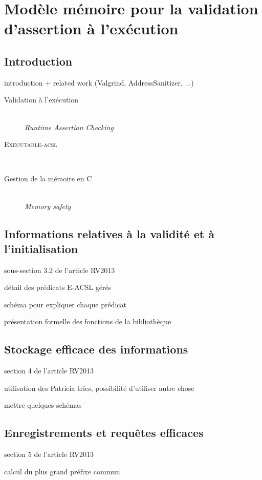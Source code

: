 
\chapter{Modèle mémoire pour la validation d'assertion à l'exécution}

\section{Introduction}
introduction + related work (Valgrind, AddressSanitizer, ...)

\begin{description}
\item[Validation à l'exécution] \hfill \\
  {\em Runtime Assertion Checking}\\
\item[\textsc{Executable-acsl}] \hfill \\
\item[Gestion de la mémoire en C] \hfill \\
  {\em Memory safety}\\
\end{description}


\section{Informations relatives à la validité et à l'initialisation}
sous-section 3.2 de l'article RV2013

détail des prédicats E-ACSL gérés

{\color{red}schéma pour expliquer chaque prédicat}

présentation formelle des fonctions de la bibliothèque

\section{Stockage efficace des informations}
section 4 de l'article RV2013

utilisation des Patricia tries, possibilité d'utiliser autre chose

{\color{red}mettre quelques schémas}

\section{Enregistrements et requêtes efficaces}
section 5 de l'article RV2013

calcul du plus grand préfixe commun

